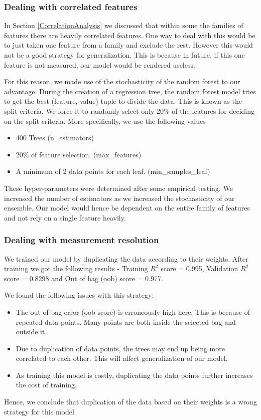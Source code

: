 \documentclass[11pt]{article}
\begin{document}
\subsubsection{Dealing with correlated features}
In Section \ref{CorrelationAnalysis} we discussed that within some the families of features there are heavily correlated features.
One way to deal with this would be to just taken one feature from a family and exclude the rest.
However this would not be a good strategy for generalization.
This is because in future,  if this one feature is not measured,  our model would be rendered useless.

For this reason,  we made use of the stochasticity of the random forest to our advantage.
During the creation of a regression tree,  the random forest model tries to get the best (feature,  value) tuple to divide the data. This is known as the split criteria.
We force it to randomly select only 20\% of the features for deciding on the split criteria.
More specifically,  we use the following values
\begin{itemize}
\item 400 Trees (n\_estimators)
\item 20\% of feature selection.  (max\_features)
\item A minimum of 2 data points for each leaf.  (min\_samples\_leaf)
\end{itemize}
These hyper-parameters were determined after some empirical testing.
We increased the number of estimators as we increased the stochasticity of our ensemble.
Our model would hence be dependent on the entire family of features and not rely on a single feature heavily.

\subsubsection{Dealing with measurement resolution}

We trained our model by duplicating the data according to their weights. 
After training we got the following results - Training $R^2$ score = 0.995,  Validation $R^2$ score = 0.8298 and  Out of bag (oob) score = 0.977.

We found the following issues with this strategy:
\begin{itemize}
\item The out of bag error (oob score) is erroneously high here. This is because of repeated data points. Many points are both inside the selected bag and outside it.
\item Due to duplication of data points,  the trees may end up being more correlated to each other.  This will affect generalization of our model.
\item As training this model is costly, duplicating the data points further increases the cost of training.
\end{itemize}
Hence, we conclude that duplication of the data based on their weights is a wrong strategy for this model.
\end{document}
